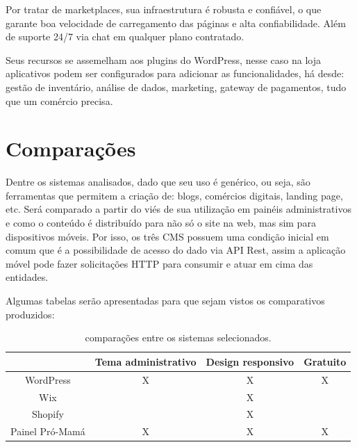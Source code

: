 Por tratar de marketplaces, sua infraestrutura é robusta e confiável, o que garante boa velocidade de carregamento das páginas e alta confiabilidade. Além de suporte 24/7 via chat em qualquer plano contratado.

Seus recursos se assemelham aos plugins do WordPress, nesse caso na loja aplicativos podem ser configurados para adicionar as funcionalidades, há desde: gestão de inventário, análise de dados, marketing, gateway de pagamentos, tudo que um comércio precisa.

\section{Comparações}

Dentre os sistemas analisados, dado que seu uso é genérico, ou seja, são ferramentas que permitem a criação de: blogs, comércios digitais, landing page, etc. Será comparado a partir do viés de sua utilização em painéis administrativos e como o conteúdo é distribuído para não só o site na web, mas sim para dispositivos móveis. Por isso, os três CMS possuem uma condição inicial em comum que é a possibilidade de acesso do dado via API Rest, assim a aplicação móvel pode fazer solicitações HTTP para consumir e atuar em cima das entidades.

Algumas tabelas serão apresentadas para que sejam vistos os comparativos produzidos:

\begin{table}[htb]
  \begin{center}
    \ABNTEXfontereduzida
    \caption{comparações entre os sistemas selecionados.}
    \label{tab-comparacao-1}
    \begin{tabular}{c|c|c|c}
      \phantom{.}     & \textbf{Tema administrativo} & \textbf{Design responsivo} & \textbf{Gratuito} \\
      \hline
      WordPress       & X                            & X                          &
      X                                                                                               \\
      \hline
      Wix             & \phantom{.}                  &
      X               & \phantom{.}                                                                   \\
      \hline
      Shopify         & \phantom{.}                  & X                          & \phantom{.}       \\
      \hline
      Painel Pró-Mamá & X                            & X                          & X                 \\
    \end{tabular}
  \end{center}
\end{table}

